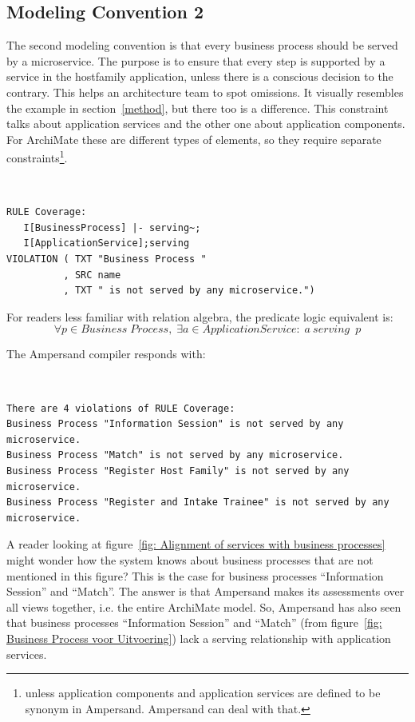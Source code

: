 \documentclass[sn-vancouver]{sn-jnl}%
\begin{document}
\subsection{Modeling Convention 2}
The second modeling convention is that every business process should be served by a microservice.
The purpose is to ensure that every step is supported by a service in the hostfamily application, unless there is a conscious decision to the contrary.
This helps an architecture team to spot omissions.
It visually resembles the example in section~\ref{method}, but there too is a difference.
This constraint talks about application services and the other one about application components.
For ArchiMate these are different types of elements, so they require separate constraints\footnote{unless application components and application services are defined to be synonym in Ampersand. Ampersand can deal with that.}.

{\tt\small
\begin{lstlisting}[frame=single, label={mc2}, caption={}]
RULE Coverage:
   I[BusinessProcess] |- serving~;
   I[ApplicationService];serving
VIOLATION ( TXT "Business Process "
          , SRC name
          , TXT " is not served by any microservice.")
\end{lstlisting}
}
For readers less familiar with relation algebra, the predicate logic equivalent is:
\[\forall p \in Business\;Process, \;\exists a\in Application Service: \;a\ serving\ \; p\]

The Ampersand compiler responds with:

{\tt\small
\begin{lstlisting}[frame=single, label={mc2result}, caption={}]
There are 4 violations of RULE Coverage:
Business Process "Information Session" is not served by any microservice.
Business Process "Match" is not served by any microservice.
Business Process "Register Host Family" is not served by any microservice.
Business Process "Register and Intake Trainee" is not served by any  microservice.
\end{lstlisting}
}

A reader looking at figure~\ref{fig: Alignment of services with business processes} might wonder
how the system knows about business processes that are not mentioned in this figure?
This is the case for business processes ``Information Session'' and ``Match''.
The answer is that Ampersand makes its assessments over all views together, i.e. the entire ArchiMate model.
So, Ampersand has also seen that business processes ``Information Session'' and ``Match''
(from figure~\ref{fig: Business Process voor Uitvoering})
lack a serving relationship with application services.
\end{document}

